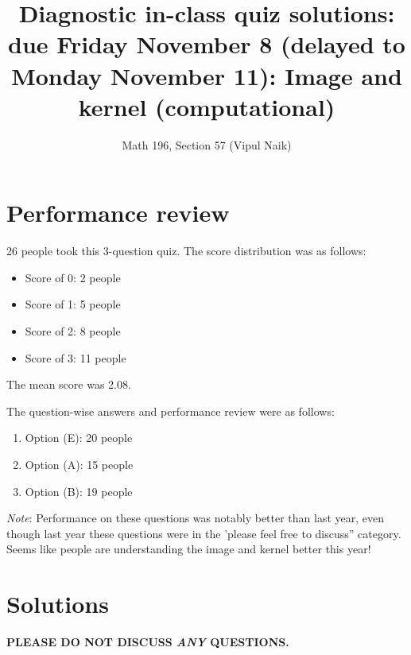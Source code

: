 \documentclass[10pt]{amsart}
\title{Diagnostic in-class quiz solutions: due Friday November 8
  (delayed to Monday November 11): Image and kernel (computational)}
\author{Math 196, Section 57 (Vipul Naik)}
\begin{document}
\maketitle

\section{Performance review}

26 people took this 3-question quiz. The score distribution was as follows:

\begin{itemize}
\item Score of 0: 2 people
\item Score of 1: 5 people
\item Score of 2: 8 people
\item Score of 3: 11 people
\end{itemize}

The mean score was 2.08.

The question-wise answers and performance review were as follows:

\begin{enumerate}
\item Option (E): 20 people
\item Option (A): 15 people
\item Option (B): 19 people
\end{enumerate}

{\em Note}: Performance on these questions was notably better than
last year, even though last year these questions were in the 'please
feel free to discuss'' category. Seems like people are understanding
the image and kernel better this year!
\section{Solutions}

{\bf PLEASE DO NOT DISCUSS {\em ANY} QUESTIONS.}
\end{document}
